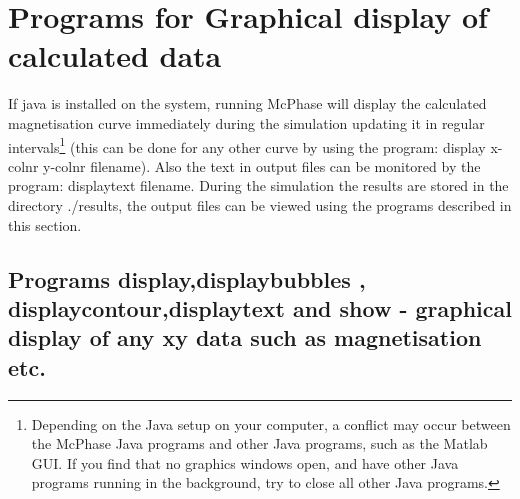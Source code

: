 
\section{Programs for Graphical display of calculated data}
\label{graphics}

If java is installed on the system, running McPhase will
 display the calculated magnetisation
curve immediately during the simulation updating 
it in regular intervals\footnote{Depending on the Java setup on your computer, a conflict may occur between the McPhase 
Java programs and other Java programs, such as the Matlab GUI. If you find that no graphics
windows open, and have other Java programs running in the background, try to close all other Java programs.}
(this can be done for any other
curve  by using the
program: {\prg display x-colnr y-colnr filename}). 
Also the text in output files can be monitored by the program:
{\prg displaytext filename}.
During the simulation
the results are stored in the directory {\prg ./results}, the output files can be viewed 
using the programs described in this section. 

\subsection{Programs {\prg display},{\prg displaybubbles },{\prg %
displaycontour},{\prg displaytext} and {\prg show} - graphical %
display of any xy data such as magnetisation etc.}
\label{display}

